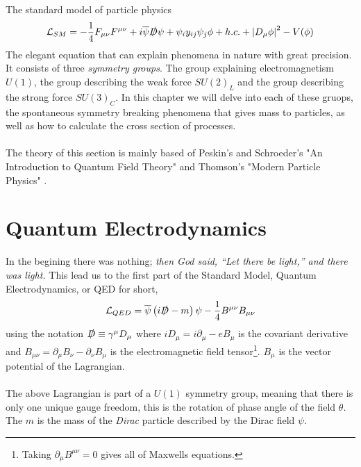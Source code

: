 \documentclass[12pt, a4paper]{book}
\begin{document}
The standard model of particle physics
\begin{equation}\label{eq:sm}
    \mathcal{L}_{SM} = -\frac{1}{4}F_{\mu\nu}F^{\mu\nu} + i\overline{\psi}\slashed{D}\psi + \psi_iy_{ij}\psi_j\phi + h.c. + \abs{D_\mu\phi}^2 - V(\phi)
\end{equation}
The elegant equation that can explain phenomena in nature with great precision. It consists of three \textit{symmetry groups}. The group explaining electromagnetism $U(1)$, the group describing the weak force $SU(2)_L$ and the group describing the strong force $SU(3)_C$. 
In this chapter we will delve into each of these gruops, the spontaneous symmetry breaking phenomena that gives mass to particles, as well as how to calculate the cross section of processes.\\
\\The theory of this section is mainly based of Peskin's and Schroeder's "An Introduction to Quantum Field Theory" \cite{Peskin:1995ev} and Thomson's "Modern Particle Physics" \cite{THOMSON}.

\clearpage
\section{Quantum Electrodynamics}
In the begining there was nothing; \textit{then God said, “Let there be light,” and there was light.} This lead us to the first part of the Standard Model, Quantum Electrodynamics, or QED for short,
\begin{equation}\label{eq:QED}
    \mathcal{L}_{QED} = \overline{\psi}\left(i\slashed{D} -m\right)\psi -\frac{1}{4}B^{\mu\nu}B_{\mu\nu}
\end{equation}
using the notation $\slashed{D}\equiv \gamma^\mu D_\mu$ where $iD_\mu = i\partial_\mu -eB_\mu$ is the covariant derivative and $B_{\mu\nu}=\partial_\mu B_\nu - \partial_\nu B_\mu$ is the electromagnetic field tensor\footnote{Taking $\partial_\mu B^{\mu\nu} = 0$ gives all of Maxwells equations.}. 
$B_\mu$ is the vector potential of the Lagrangian.\\ 
\\The above Lagrangian is part of a $U(1)$ symmetry group, meaning that there is only one unique gauge freedom, this is the rotation of phase angle of the field $\theta$. The $m$ is the mass of the \textit{Dirac} particle described by the Dirac field $\psi$.
\end{document}
